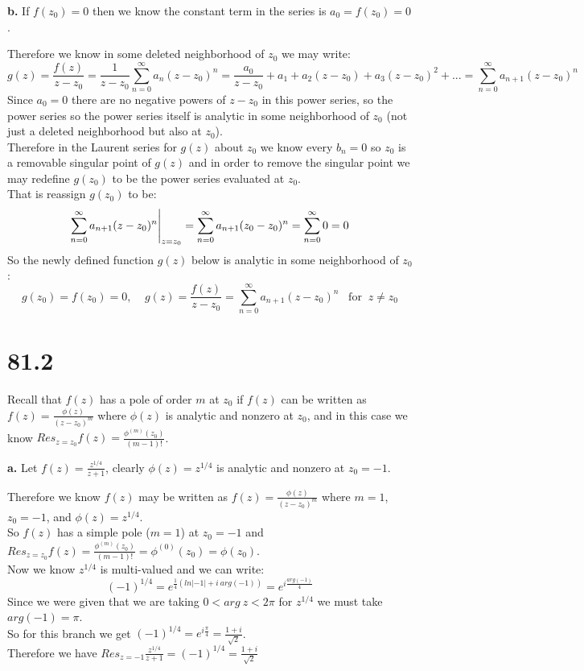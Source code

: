 \documentclass{article}
\begin{document}
{\Large\textbf{b.}} If $f(z_0) = 0$ then we know the constant term in the series is $a_0 = f(z_0) = 0$.
\begin{center}
    \doublespacing
    Therefore we know in some deleted neighborhood of $z_0$ we may write:
    \[g(z) =\frac{f(z)}{z - z_0} =\frac{1}{z - z_0}\sum _{n=0}^{\infty} a_n (z - z_0)^n =\frac{a_0}{z - z_0} + a_1 + a_2 (z - z_0) + a_3 (z - z_0)^2 + ... =\sum _{n=0}^{\infty} a_{n+1} (z - z_0)^n\]
    Since $a_0 = 0$ there are no negative powers of $z - z_0$ in this power series, so the power series so the power series itself is analytic in some neighborhood of $z_0$ (not just a deleted neighborhood but also at $z_0$).
    \\Therefore in the Laurent series for $g(z)$ about $z_0$ we know every $b_n = 0$ so $z_0$ is a removable singular point of $g(z)$ and in order to remove the singular point we may redefine $g(z_0)$ to be the power series evaluated at $z_0$.
    \\That is reassign $g(z_0)$ to be:
    \[\sum _{n=0}^{\infty} a_{n+1} (z - z_0)^n\Bigg{|}_{z=z_0} =\sum _{n=0}^{\infty} a_{n+1} (z_0 - z_0)^n =\sum _{n=0}^{\infty} 0 = 0\]
    So the newly defined function $g(z)$ below is analytic in some neighborhood of $z_0$:
    \[g(z_0) = f(z_0) = 0,\;\;\;\;g(z) =\frac{f(z)}{z - z_0} =\sum _{n=0}^{\infty} a_{n+1} (z - z_0)^n\;\;\;\text{for}\;\;z\neq z_0\]
    \qedsymbol
\end{center}


\newpage
\section*{81.2}
\begin{center}
    \doublespacing
    Recall that $f(z)$ has a pole of order $m$ at $z_0$ if $f(z)$ can be written as $f(z) =\frac{\phi (z)}{(z - z_0)^m}$ where $\phi (z)$ is analytic and nonzero at $z_0$, and in this case we know $Res_{z=z_0} f(z) =\frac{\phi ^{(m)} (z_0)}{(m-1)!}$.
\end{center}

{\Large\textbf{a.}} Let $f(z) =\frac{z^{1/4}}{z + 1}$, clearly $\phi (z) = z^{1/4}$ is analytic and nonzero at $z_0 = -1$.
\begin{center}
    \doublespacing
    Therefore we know $f(z)$ may be written as $f(z) =\frac{\phi (z)}{(z - z_0)^m}$ where $m = 1$, $z_0 = -1$, and $\phi (z) = z^{1/4}$.
    \\So $f(z)$ has a simple pole ($m = 1$) at $z_0 = -1$ and $Res_{z=z_0} f(z) =\frac{\phi ^{(m)} (z_0)}{(m-1)!} =\phi ^{(0)} (z_0) =\phi (z_0)$.
    \\Now we know $z^{1/4}$ is multi-valued and we can write:
    \[(-1)^{1/4} = e^{\frac{1}{4}(ln|-1| + i\:arg(-1))} = e^{i\frac{arg(-1)}{4}}\]
    Since we were given that we are taking $0 < arg\:z < 2\pi$ for $z^{1/4}$ we must take $arg(-1) =\pi$.
    \\So for this branch we get $(-1)^{1/4} = e^{i\frac{\pi}{4}} =\frac{1 + i}{\sqrt{2}}$.
    \\Therefore we have $Res_{z=-1}\frac{z^{1/4}}{z + 1} = (-1)^{1/4} =\frac{1 + i}{\sqrt{2}}$ \qedsymbol
\end{center}
\end{document}
